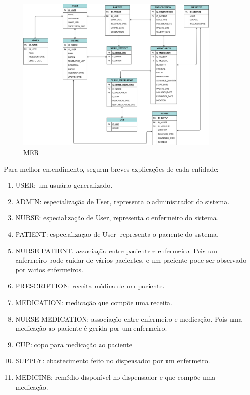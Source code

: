 \begin{figure}[H]
    \centering
    \includegraphics[width=0.9\textwidth]{figuras/database.png}
    \caption{MER}
    \label{fig:der}
\end{figure}

Para melhor entendimento, seguem breves explicações de cada entidade:

\begin{enumerate}
  \item USER: um usuário generalizado.
  \item ADMIN: especialização de User, representa o administrador do sistema.
  \item NURSE: especialização de User, representa o enfermeiro do sistema.
  \item PATIENT: especialização de User, representa o paciente do sistema.
  \item NURSE PATIENT: associação entre paciente e enfermeiro. Pois um enfermeiro pode cuidar de vários pacientes, e um paciente pode ser observado por vários enfermeiros.
  \item PRESCRIPTION: receita médica de um paciente.
  \item MEDICATION: medicação que compõe uma receita.
  \item NURSE MEDICATION: associação entre enfermeiro e medicação. Pois uma medicação ao paciente é gerida por um enfermeiro.
  \item CUP: copo para medicação ao paciente.
  \item SUPPLY: abastecimento feito no dispensador por um enfermeiro.
  \item MEDICINE: remédio disponível no dispensador e que compõe uma medicação.
\end{enumerate}

